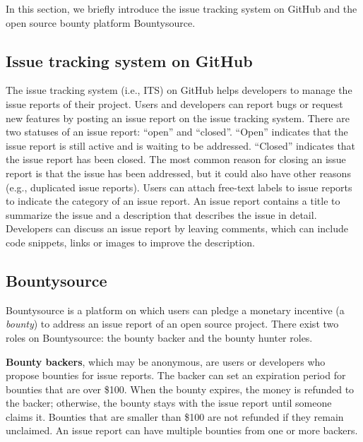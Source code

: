 In this section, we briefly introduce the issue tracking system on GitHub and the open source bounty platform Bountysource.


\subsection{Issue tracking system on GitHub}


The issue tracking system (i.e., ITS) on GitHub helps developers to manage the issue reports of their project. Users and developers can report bugs or request new features by posting an issue report on the issue tracking system. There are two statuses of an issue report: ``open'' and ``closed''. ``Open'' indicates that the issue report is still active and is waiting to be addressed. ``Closed'' indicates that the issue report has been closed. The most common reason for closing an issue report is that the issue has been addressed, but it could also have other reasons (e.g., duplicated issue reports).
Users can attach free-text labels to issue reports to indicate the category of an issue report.
An issue report contains a title to summarize the issue and a description that describes the issue in detail.
Developers can discuss an issue report by leaving comments, which can include code snippets, links or images to improve the description.



\subsection{Bountysource}
Bountysource is a platform on which users can pledge a monetary incentive (a \textit{bounty}) to address an issue report of an open source project.
There exist two roles on Bountysource: the bounty backer and the bounty hunter roles.

\noindent\textbf{Bounty backers}, which may be anonymous, are users or developers who propose bounties for issue reports. The backer can set an expiration period for bounties that are over \$100. When the bounty expires, the money is refunded to the backer; otherwise, the bounty stays with the issue report until someone claims it. Bounties that are smaller than \$100 are not refunded if they remain unclaimed. An issue report can have multiple bounties from one or more backers.

